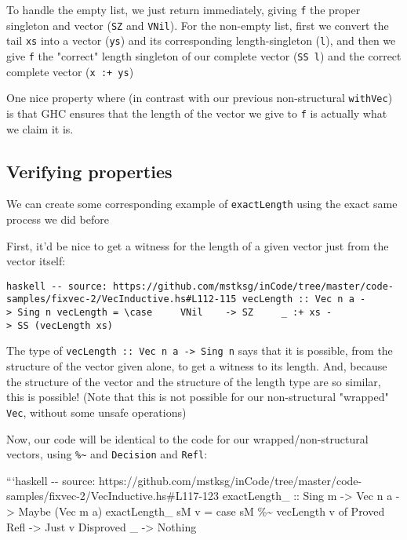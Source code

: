 \documentclass[]{article}
\begin{document}
To handle the empty list, we just return immediately, giving \texttt{f} the
proper singleton and vector (\texttt{SZ} and \texttt{VNil}). For the non-empty
list, first we convert the tail \texttt{xs} into a vector (\texttt{ys}) and its
corresponding length-singleton (\texttt{l}), and then we give \texttt{f} the
"correct" length singleton of our complete vector (\texttt{SS\ l}) and the
correct complete vector (\texttt{x\ :+\ ys})

One nice property where (in contrast with our previous non-structural
\texttt{withVec}) is that GHC ensures that the length of the vector we give to
\texttt{f} is actually what we claim it is.

\subsection{Verifying properties}

We can create some corresponding example of \texttt{exactLength} using the exact
same process we did before

First, it'd be nice to get a witness for the length of a given vector just from
the vector itself:

\texttt{haskell\ -\/-\ source:\ https://github.com/mstksg/inCode/tree/master/code-samples/fixvec-2/VecInductive.hs\#L112-115\ vecLength\ ::\ Vec\ n\ a\ -\textgreater{}\ Sing\ n\ vecLength\ =\ \textbackslash{}case\ \ \ \ \ VNil\ \ \ \ -\textgreater{}\ SZ\ \ \ \ \ \_\ :+\ xs\ -\textgreater{}\ SS\ (vecLength\ xs)}

The type of \texttt{vecLength\ ::\ Vec\ n\ a\ -\textgreater{}\ Sing\ n} says
that it is possible, from the structure of the vector given alone, to get a
witness to its length. And, because the structure of the vector and the
structure of the length type are so similar, this is possible! (Note that this
is not possible for our non-structural "wrapped" \texttt{Vec}, without some
unsafe operations)

Now, our code will be identical to the code for our wrapped/non-structural
vectors, using \texttt{\%\textasciitilde{}} and \texttt{Decision} and
\texttt{Refl}:

```haskell -\/- source:
https://github.com/mstksg/inCode/tree/master/code-samples/fixvec-2/VecInductive.hs\#L117-123
exactLength\_ :: Sing m -\textgreater{} Vec n a -\textgreater{} Maybe (Vec m a)
exactLength\_ sM v = case sM \%\textasciitilde{} vecLength v of Proved Refl
-\textgreater{} Just v Disproved \_ -\textgreater{} Nothing
\end{document}
